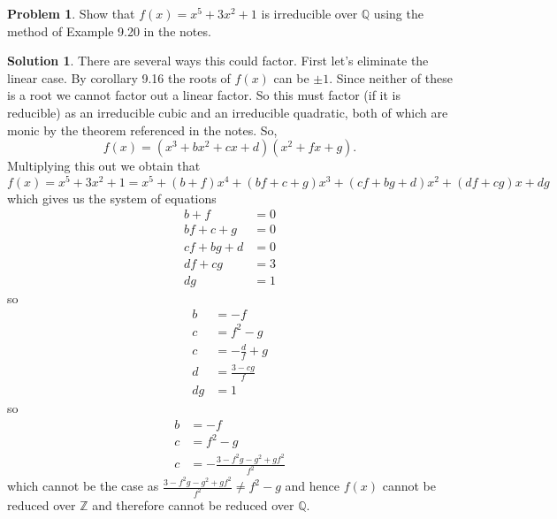 \documentclass[10pt]{article}
\theoremstyle{definition}
\newtheorem{problem}{Problem}
\newtheorem{soln}{Solution}
\begin{document}
\begin{problem}
Show that $f (x) = x^5 +3x^2 +1$ is irreducible over $\mathbb{Q}$ using the method
of Example 9.20 in the notes.
\end{problem}
\begin{soln}
  There are several ways this could factor. First let's eliminate the linear case. By corollary 9.16 the roots of $f(x)$ can be $\pm 1$. Since neither of these is a root
  we cannot factor out a linear factor. So this must factor (if it is reducible) as an irreducible cubic and an irreducible quadratic, both of which are monic by the theorem referenced in the notes. So,
  $$f(x)=(x^3+bx^2+cx+d)(x^2+fx+g).$$
  Multiplying this out we obtain that
  $$f(x)=x^5 +3x^2 +1=x^5+(b + f)x^4  + (bf + c + g)x^3 + (cf + bg + d)x^2  + (df + cg)x+ dg$$
  which gives us the system of equations
  \begin{align*}
    b + f       & =0 \\
    bf + c + g  & =0 \\
    cf + bg + d & =0 \\
    df + cg     & =3 \\
    dg          & =1
  \end{align*}
  so
  \begin{align*}
    b       & =-f             \\
    c       & =f^2-g          \\
    c       & =-\frac{d}{f}+g \\
    d & =\frac{3-cg}{f}              \\
    dg      & =1
  \end{align*}
  so
  \begin{align*}
    b       & =-f             \\
    c       & =f^2-g          \\
    c       & =-\frac{3-f^2g-g^2+gf^2}{f^2} 
  \end{align*}
  which cannot be the case as $\frac{3-f^2g-g^2+gf^2}{f^2}\neq f^2-g$ and hence $f(x)$ cannot be reduced over $\mathbb{Z}$ and therefore cannot be reduced over $\mathbb{Q}$.
\end{soln}
\end{document}
